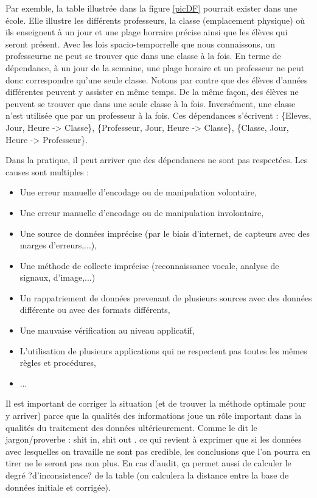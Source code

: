\documentclass[12pt, a4paper, oneside, titlepage]{book}%
\begin{document}
Par exemble, la table illustrée dans la figure \ref{picDF} pourrait exister dans une école. Elle illustre les différents professeurs, la classe (emplacement physique) où ils enseignent à un jour et une plage horraire précise ainsi que les élèves qui seront présent. Avec les lois spacio-temporrelle que nous connaissons, un professeurne ne peut se trouver que dans une classe à la fois. En terme de dépendance, à un jour de la semaine, une plage horaire et un professeur ne peut donc correspondre qu'une seule classe. Notons par contre que des élèves d'années différentes peuvent y assister en même temps. De la même façon, des élèves ne peuvent se trouver que dans une seule classe à la fois. Inversément, une classe n'est utilisée que par un professeur à la fois.
Ces dépendances s'écrivent : \{Eleves, Jour, Heure -> Classe\}, \{Professeur, Jour, Heure -> Classe\}, \{Classe, Jour, Heure -> Professeur\}.

Dans la pratique, il peut arriver que des dépendances ne sont pas respectées. Les causes sont multiples :
\begin{itemize}
\item Une erreur manuelle d'encodage ou de manipulation volontaire, 
\item Une erreur manuelle d'encodage ou de manipulation involontaire, 
\item Une source de données imprécise (par le biais d'internet, de capteurs avec des marges d'erreurs,...), 
\item Une méthode de collecte imprécise (reconnaissance vocale, analyse de signaux, d'image,...)
\item Un rappatriement de données prevenant de plusieurs sources avec des données différente ou avec des formats différents,
\item Une mauvaise vérification au niveau applicatif,
\item L'utilisation de plusieurs applications qui ne respectent pas toutes les mêmes règles et procédures,
\item ...
\end{itemize}

Il est important de corriger la situation (et de trouver la méthode optimale pour y arriver) parce que la qualités des informations joue un rôle important dans la qualités du traitement des données ultérieurement. Comme le dit le jargon/proverbe : \og shit in, shit out \fg. ce qui revient à exprimer que si les données avec lesquelles on travaille ne sont pas credible, les conclusions que l'on pourra en tirer ne le seront pas non plus. En cas d'audit, ça permet aussi de calculer le degré ?d'inconsistence? de la table (on calculera la distance entre la base de données initiale et corrigée). 
\end{document}

